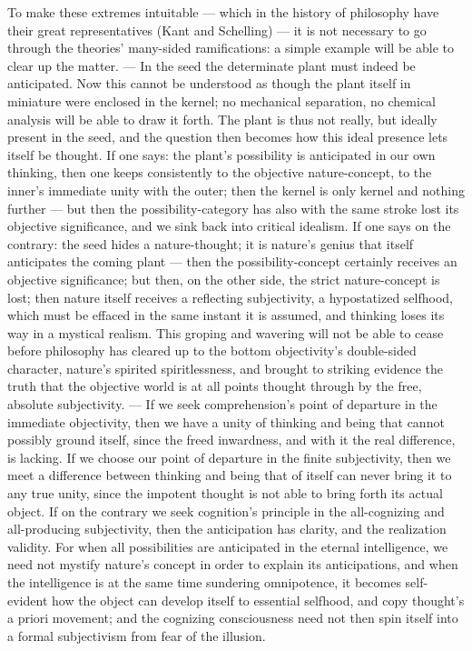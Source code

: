 \documentclass[12pt]{book}
\begin{document}
To make these extremes intuitable --- which in the history of philosophy
have their great representatives (Kant and Schelling) --- it is not
necessary to go through the theories' many-sided ramifications: a simple
example will be able to clear up the matter. --- In the seed the determinate
plant must indeed be anticipated. Now this cannot be understood as though
the plant itself in miniature were enclosed in the kernel; no mechanical
separation, no chemical analysis will be able to draw it forth. The plant is
thus not really, but ideally present in the seed, and the question then
becomes how this ideal presence lets itself be thought. If one says: the
plant's possibility is anticipated in our own thinking, then one keeps
consistently to the objective nature-concept, to the inner's immediate unity
with the outer; then the kernel is only kernel and nothing further --- but
then the possibility-category has also with the same stroke lost its
objective significance, and we sink back into critical idealism. If one says
on the contrary: the seed hides a nature-thought; it is nature's genius that
itself anticipates the coming plant --- then the possibility-concept
certainly receives an objective significance; but then, on the other side,
the strict nature-concept is lost; then nature itself receives a reflecting
subjectivity, a hypostatized selfhood, which must be effaced in the same
instant it is assumed, and thinking loses its way in a mystical realism.
This groping and wavering will not be able to cease before philosophy has
cleared up to the bottom objectivity's double-sided character, nature's
spirited spiritlessness, and brought to striking evidence the truth that the
objective world is at all points thought through by the free, absolute
subjectivity. --- If we seek comprehension's point of departure in the
immediate objectivity, then we have a unity of thinking and being that
cannot possibly ground itself, since the freed inwardness, and with it the
real difference, is lacking. If we choose our point of departure in the
finite subjectivity, then we meet a difference between thinking and being
that of itself can never bring it to any true unity, since the impotent
thought is not able to bring forth its actual object. If on the contrary we
seek cognition's principle in the all-cognizing and all-producing
subjectivity, then the anticipation has clarity, and the realization
validity. For when all possibilities are anticipated in the eternal
intelligence, we need not mystify nature's concept in order to explain its
anticipations, and when the intelligence is at the same time sundering
omnipotence, it becomes self-evident how the object can develop itself to
essential selfhood, and copy thought's a priori movement; and the cognizing
consciousness need not then spin itself into a formal subjectivism from fear
of the illusion.
\end{document}
